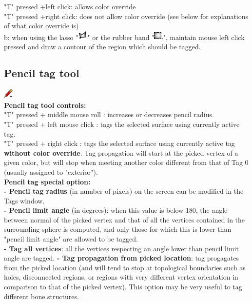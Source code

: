  "T" pressed +left click: allows color override\\
 "T" pressed +right click: does not allow color override (see below for explanations of what color override is)\\
b: when using the lasso "\includegraphics[scale=0.7]{images/12/lasso.png}" or the rubber band "\includegraphics[scale=0.7]{images/12/rubber_band.png}", maintain mouse left click pressed and draw a contour of the region which should be tagged.



\subsection{Pencil tag tool}
\includegraphics[scale=0.7]{images/12/pencil.png}\\
\textbf{Pencil tag tool controls:}\\
"T" pressed + middle mouse roll : increases or decreases pencil radius.\\
"T" pressed + left mouse click : tags the selected surface using currently active tag.\\
"T" pressed + right click : tags the selected surface using currently active tag \textbf{without color override}. Tag propagation will start at the picked vertex of a given color, but will stop when meeting another color different from that of Tag 0 (usually assigned to "exterior").\\

\textbf{Pencil tag special option:}\\
\noindent
\textbf{- Pencil tag radius} (in number of pixels) on the screen can be modified in the Tags window.\\
\textbf{- Pencil limit angle} (in degrees): when this value is below 180, the angle between normal of the picked vertex and that of all the vertices contained in the surrounding sphere is computed, and only those for which this is lower than "pencil limit angle" are allowed to be tagged.\\
\textbf{- Tag all vertices}: all the vertices respecting an angle lower than pencil limit angle are tagged.
\textbf{- Tag propagation from picked location}: tag progagates from the picked location (and will tend to stop at topological boundaries such as holes, disconnected regions,  or regions with very different vertex orientation in comparison to that of the picked vertex). This option may be very useful to tag different bone structures.




